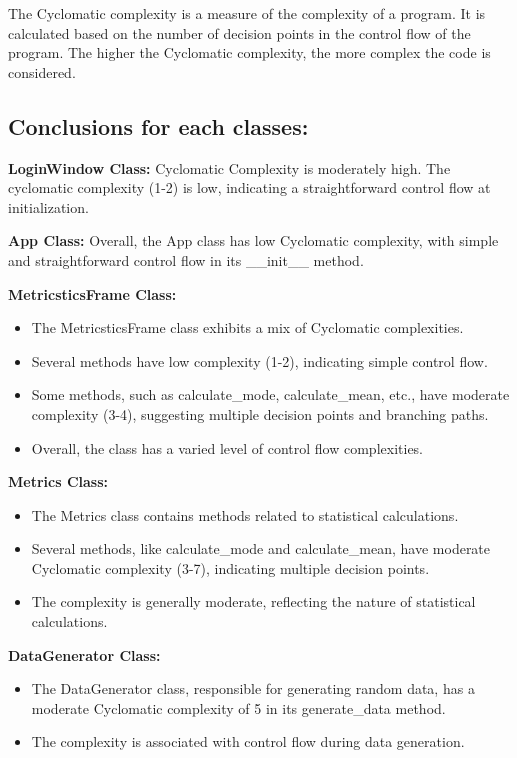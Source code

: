 {{{{\begin{itemize}[noitemsep]
            The Cyclomatic complexity is a measure of the complexity of a program. It is calculated based on the number of decision points in the control flow of the program. The higher the Cyclomatic complexity, the more complex the code is considered.
\end{itemize}

\pagebreak
\subsection{Conclusions for each classes:}

\textbf{\normalsize{LoginWindow Class:}}
\normalsize{Cyclomatic Complexity is moderately high. The cyclomatic complexity (1-2) is low, indicating a straightforward control flow at initialization.}

\textbf{\normalsize{App Class:}}
\normalsize{Overall, the App class has low Cyclomatic complexity, with simple and straightforward control flow in its \_\_init\_\_ method.\linebreak }

\textbf{\normalsize{MetricsticsFrame Class: }}
\normalsize{
\begin{itemize}[noitemsep]
    \item The MetricsticsFrame class exhibits a mix of Cyclomatic complexities.
    \item Several methods have low complexity (1-2), indicating simple control flow. 
    \item Some methods, such as calculate\_mode, calculate\_mean, etc., have moderate complexity (3-4), suggesting multiple decision points and branching paths. 
    \item Overall, the class has a varied level of control flow complexities. 
\end{itemize}}

\textbf{\normalsize{Metrics Class: }}
\normalsize{\begin{itemize}[noitemsep]
    \item The Metrics class contains methods related to statistical calculations.
    \item Several methods, like calculate\_mode and calculate\_mean, have moderate Cyclomatic complexity (3-7), indicating multiple decision points. 
    \item The complexity is generally moderate, reflecting the nature of statistical calculations. 
\end{itemize}}

\textbf{\normalsize{DataGenerator Class: }}
\normalsize{\begin{itemize}[noitemsep]
    \item The DataGenerator class, responsible for generating random data, has a moderate Cyclomatic complexity of 5 in its generate\_data method. 
    \item The complexity is associated with control flow during data generation. 
\end{itemize}}

}}}}
